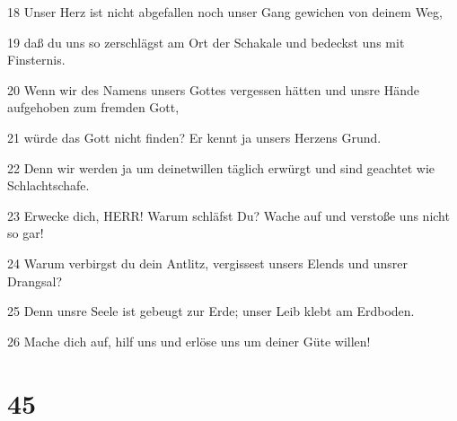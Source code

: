 \par 18 Unser Herz ist nicht abgefallen noch unser Gang gewichen von deinem Weg,
\par 19 daß du uns so zerschlägst am Ort der Schakale und bedeckst uns mit Finsternis.
\par 20 Wenn wir des Namens unsers Gottes vergessen hätten und unsre Hände aufgehoben zum fremden Gott,
\par 21 würde das Gott nicht finden? Er kennt ja unsers Herzens Grund.
\par 22 Denn wir werden ja um deinetwillen täglich erwürgt und sind geachtet wie Schlachtschafe.
\par 23 Erwecke dich, HERR! Warum schläfst Du? Wache auf und verstoße uns nicht so gar!
\par 24 Warum verbirgst du dein Antlitz, vergissest unsers Elends und unsrer Drangsal?
\par 25 Denn unsre Seele ist gebeugt zur Erde; unser Leib klebt am Erdboden.
\par 26 Mache dich auf, hilf uns und erlöse uns um deiner Güte willen!

\chapter{45}

